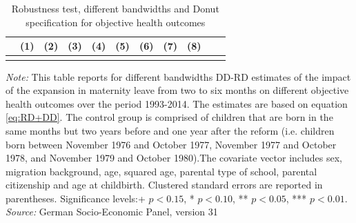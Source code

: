 \documentclass[a4paper ]{article}
\begin{document}
\newpage
\begin{landscape}
\begin{table}[p] \centering
\def\sym#1{\ifmmode^{#1}\else\(^{#1}\)\fi}
\caption{Robustness test, different bandwidths and Donut specification for objective health outcomes}\label{tab:OHBW}
\begin{tabular}{l*{10}{c}}
\toprule
  &\multicolumn{1}{c}{(1)}&\multicolumn{1}{c}{(2)}&\multicolumn{1}{c}{(3)}&\multicolumn{1}{c}{(4)}&\multicolumn{1}{c}{(5)}&\multicolumn{1}{c}{(6)}&\multicolumn{1}{c}{(7)}&\multicolumn{1}{c}{(8)} \\

\midrule\\
	 
 \bottomrule
\end{tabular}
\begin{minipage}{1.4\textwidth} %
{\footnotesize \textit{Note:} This table reports for different bandwidths DD-RD estimates of the impact of the expansion in maternity leave from two to six months on different objective health outcomes over the period 1993-2014. The estimates are based on equation \ref{eq:RD+DD}. The control group is comprised of children that are born in the same months but two years before and one year after the reform (i.e. children born between November 1976 and October 1977, November 1977 and October 1978, and November 1979 and October 1980).The covariate vector includes sex, migration background, age, squared age, parental type of school, parental citizenship and age at childbirth.\newline
Clustered standard errors are reported in parentheses. Significance levels:+ \(p<0.15\), * \(p<0.10\), ** \(p<0.05\), *** \(p<0.01\). \newline \textit{Source: }German Socio-Economic Panel, version 31\par}
\end{minipage}
\end{table}
\end{landscape}

\end{document}

